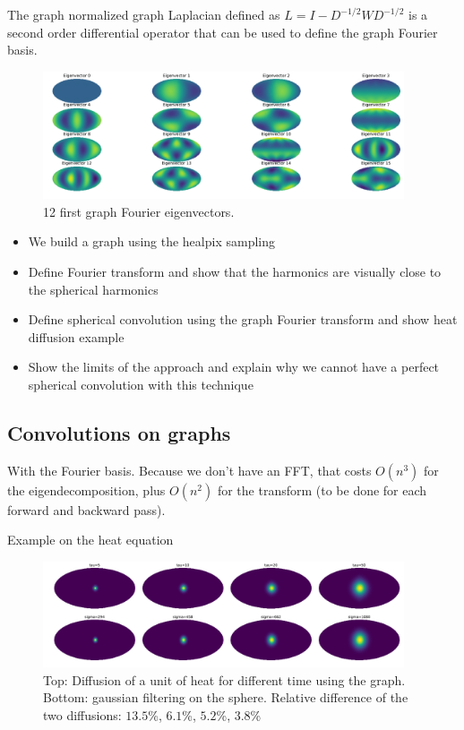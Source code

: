 \documentclass[preprint,12pt,authoryear]{elsarticle}
\newcommand{\assign}[1]{{\color[rgb]{.8,.5,.8}{Assigned: #1 }}}
\begin{document}
The graph normalized graph Laplacian defined as $L = I - D^{-1/2} W D^{-1/2}$ is a second order differential operator that can be used to define the graph Fourier basis. 

\begin{figure}[!ht]
\centering
\includegraphics[width=0.95\textwidth]{figures/eigenvectors.pdf}
\caption{12 first graph Fourier eigenvectors.}
\label{fig:graph_harmonics}
\end{figure}
 
\begin{itemize}
	\item We build a graph using the healpix sampling
	\item Define Fourier transform and show that the harmonics are visually close to the spherical harmonics
	\item Define spherical convolution using the graph Fourier transform and show heat diffusion example
	\item Show the limits of the approach and explain why we cannot have a perfect spherical convolution with this technique
\end{itemize}

\subsection{Convolutions on graphs}
\assign{Nathanaël, Michaël}

With the Fourier basis. Because we don't have an FFT, that costs $O(n^3)$ for the eigendecomposition, plus $O(n^2)$ for the transform (to be done for each forward and backward pass).

Example on the heat equation
\begin{figure}[!ht]
\centering
\includegraphics[width=0.95\textwidth]{figures/gaussian_filters_sphere.pdf}
\caption{Top: Diffusion of a unit of heat for different time using the graph. Bottom: gaussian filtering on the sphere. Relative difference of the two diffusions: $13.5$\%, $6.1$\%, $5.2$\%, $3.8$\% }
\label{fig:gaussian_filters_comparizon}
\end{figure}
\end{document}
